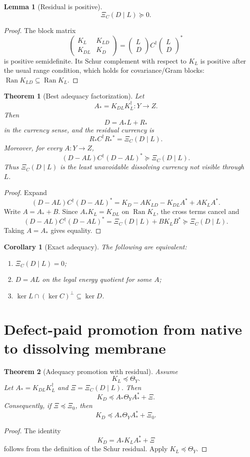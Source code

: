 \documentclass[11pt]{article}
\newtheorem{theorem}{Theorem}
\newtheorem{lemma}{Lemma}
\newtheorem{corollary}{Corollary}
\DeclareMathOperator{\Ran}{Ran}
\begin{document}
\begin{lemma}[Residual is positive]
\[
\Xi_C(D\mid L)\succeq0.
\]
\end{lemma}
\begin{proof}
The block matrix
\[
\begin{pmatrix}
K_L & K_{LD}\\
K_{DL} & K_D
\end{pmatrix}
=
\begin{pmatrix} L\\ D\end{pmatrix}
C^\dagger
\begin{pmatrix} L\\ D\end{pmatrix}^*
\]
is positive semidefinite.  Its Schur complement with respect to $K_L$ is positive after the usual range condition, which holds for covariance/Gram blocks:
$\Ran K_{LD}\subseteq \Ran K_L$.
\end{proof}

\begin{theorem}[Best adequacy factorization]
Let
\[
A_* = K_{DL}K_L^\dagger:Y\to Z.
\]
Then
\[
D=A_*L+R_*
\]
in the currency sense, and the residual currency is
\[
R_*C^\dagger R_*{}^*=
\Xi_C(D\mid L).
\]
Moreover, for every $A:Y\to Z$,
\[
(D-AL)C^\dagger(D-AL)^*\succeq \Xi_C(D\mid L).
\]
Thus $\Xi_C(D\mid L)$ is the least unavoidable dissolving currency not visible through $L$.
\end{theorem}

\begin{proof}
Expand
\[
(D-AL)C^\dagger(D-AL)^*
=K_D-AK_{LD}-K_{DL}A^*+AK_LA^*.
\]
Write $A=A_*+B$.  Since $A_*K_L=K_{DL}$ on $\Ran K_L$, the cross terms cancel and
\[
(D-AL)C^\dagger(D-AL)^*
=\Xi_C(D\mid L)+B K_L B^*\succeq\Xi_C(D\mid L).
\]
Taking $A=A_*$ gives equality.
\end{proof}

\begin{corollary}[Exact adequacy]
The following are equivalent:
\begin{enumerate}[label=(\alph*)]
\item $\Xi_C(D\mid L)=0$;
\item $D=A L$ on the legal energy quotient for some $A$;
\item $\ker L\cap(\ker C)^\perp\subseteq \ker D$.
\end{enumerate}
\end{corollary}

\section{Defect-paid promotion from native to dissolving membrane}
\begin{theorem}[Adequacy promotion with residual]
Assume
\[
K_L\preceq\Theta_Y.
\]
Let $A_*=K_{DL}K_L^\dagger$ and $\Xi=\Xi_C(D\mid L)$. Then
\[
\boxed{
K_D\preceq A_*\Theta_YA_*^*+\Xi.
}
\]
Consequently, if $\Xi\preceq\Xi_0$, then
\[
K_D\preceq A_*\Theta_YA_*^*+\Xi_0.
\]
\end{theorem}
\begin{proof}
The identity
\[
K_D=A_*K_LA_*^*+\Xi
\]
follows from the definition of the Schur residual.  Apply $K_L\preceq\Theta_Y$.
\end{proof}
\end{document}
